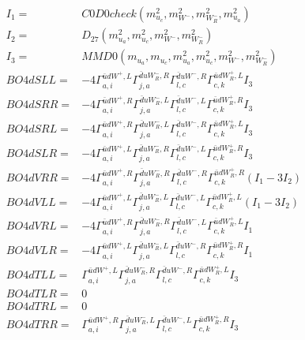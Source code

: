 \documentclass[A4,landscape]{article}
\begin{document}
\begin{align} 
I_1 = & C0D0check(m^2_{u_{{c}}}, m^2_{W^-}, m^2_{W_R^-}, m^2_{u_{{a}}}) \\ 
I_2 = & D_{27}(m^2_{u_{{a}}}, m^2_{u_{{c}}}, m^2_{W^-}, m^2_{W_R^-}) \\ 
I_3 = & MMD0(m_{u_{{a}}}, m_{u_{{c}}}, m^2_{u_{{a}}}, m^2_{u_{{c}}}, m^2_{W^-}, m^2_{W_R^-}) \\ 
  BO4dSLL= & -4  \Gamma^{\bar{u}d W^+,L}_{a, i} \Gamma^{\bar{d}u W_R^- ,R}_{j, a} \Gamma^{\bar{d}u W^- ,R}_{l, c} \Gamma^{\bar{u}d W_R^+,L}_{c, k} I_3 \\ 
  BO4dSRR= & -4  \Gamma^{\bar{u}d W^+,R}_{a, i} \Gamma^{\bar{d}u W_R^- ,L}_{j, a} \Gamma^{\bar{d}u W^- ,L}_{l, c} \Gamma^{\bar{u}d W_R^+,R}_{c, k} I_3 \\ 
  BO4dSRL= & -4  \Gamma^{\bar{u}d W^+,R}_{a, i} \Gamma^{\bar{d}u W_R^- ,L}_{j, a} \Gamma^{\bar{d}u W^- ,R}_{l, c} \Gamma^{\bar{u}d W_R^+,L}_{c, k} I_3 \\ 
  BO4dSLR= & -4  \Gamma^{\bar{u}d W^+,L}_{a, i} \Gamma^{\bar{d}u W_R^- ,R}_{j, a} \Gamma^{\bar{d}u W^- ,L}_{l, c} \Gamma^{\bar{u}d W_R^+,R}_{c, k} I_3 \\ 
  BO4dVRR= & -4  \Gamma^{\bar{u}d W^+,R}_{a, i} \Gamma^{\bar{d}u W_R^- ,R}_{j, a} \Gamma^{\bar{d}u W^- ,R}_{l, c} \Gamma^{\bar{u}d W_R^+,R}_{c, k} (I_1 - 3 I_2) \\ 
  BO4dVLL= & -4  \Gamma^{\bar{u}d W^+,L}_{a, i} \Gamma^{\bar{d}u W_R^- ,L}_{j, a} \Gamma^{\bar{d}u W^- ,L}_{l, c} \Gamma^{\bar{u}d W_R^+,L}_{c, k} (I_1 - 3 I_2) \\ 
  BO4dVRL= & -4  \Gamma^{\bar{u}d W^+,R}_{a, i} \Gamma^{\bar{d}u W_R^- ,R}_{j, a} \Gamma^{\bar{d}u W^- ,L}_{l, c} \Gamma^{\bar{u}d W_R^+,L}_{c, k} I_1 \\ 
  BO4dVLR= & -4  \Gamma^{\bar{u}d W^+,L}_{a, i} \Gamma^{\bar{d}u W_R^- ,L}_{j, a} \Gamma^{\bar{d}u W^- ,R}_{l, c} \Gamma^{\bar{u}d W_R^+,R}_{c, k} I_1 \\ 
  BO4dTLL= &  \Gamma^{\bar{u}d W^+,L}_{a, i} \Gamma^{\bar{d}u W_R^- ,R}_{j, a} \Gamma^{\bar{d}u W^- ,R}_{l, c} \Gamma^{\bar{u}d W_R^+,L}_{c, k} I_3 \\ 
  BO4dTLR= & 0 \\ 
  BO4dTRL= & 0 \\ 
  BO4dTRR= &  \Gamma^{\bar{u}d W^+,R}_{a, i} \Gamma^{\bar{d}u W_R^- ,L}_{j, a} \Gamma^{\bar{d}u W^- ,L}_{l, c} \Gamma^{\bar{u}d W_R^+,R}_{c, k} I_3 \\ 
\end{align} 
\end{document}
